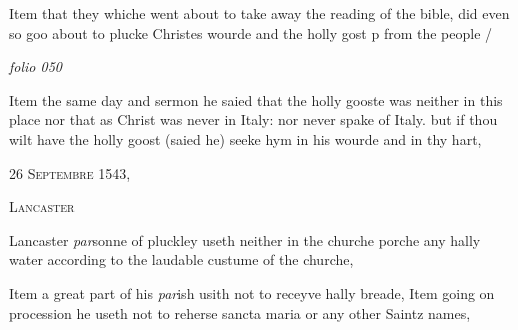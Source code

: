\documentclass[12pt, a4paper]{book}
\begin{document}
 
		\ifthenelse{\isodd{\thepage}}
		{\reversemarginpar}
		{\normalmarginpar}
		Item that they whiche went about to take away
 the reading of the bible, did even so goo
 about to plucke Christes wourde and the holly
 gost p from the people /
			



\dotfill
					

\textit{folio 050}



		\ifthenelse{\isodd{\thepage}}
		{\reversemarginpar}
		{\normalmarginpar}
		Item the same day and sermon he saied that the
 holly gooste was neither in this place nor that
 as Christ was never in Italy: nor never
 spake of Italy. but if thou wilt have the
 holly goost (saied he) seeke hym in his wourde
 and in thy hart,
			
 

            
            
               
				\begin{center} \begin{large} {\scshape 
                  26 Septembre 1543,} \end{large} \end{center}
			
               
               	
				\begin{center}  {\scshape Lancaster}  \end{center}
			
               	
				\marginpar[\vspace{0.5cm}{\textcolor{Gray}{holy water}}]{}
			
		\ifthenelse{\isodd{\thepage}}
		{\reversemarginpar}
		{\normalmarginpar}
		Lancaster \textit{par}sonne of pluckley useth neither in the
 churche porche any hally water according to the
 laudable custume of the churche,
               	
               		
				\marginpar[\vspace{0.5cm}{\textcolor{Gray}{holy bread}}]{}
			
               		
		\ifthenelse{\isodd{\thepage}}
		{\reversemarginpar}
		{\normalmarginpar}
		Item a great part of his \textit{par}ish usith not to
 receyve hally breade,
 Item going on procession he useth not to reherse
 sancta maria or any other Saintz names,
               	
\end{document}
